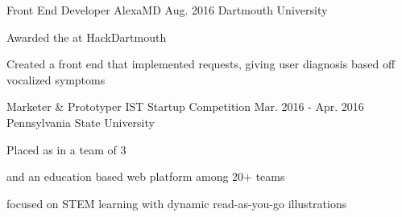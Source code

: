 

\begin{cventries}

%
  \cventry
    {Front End Developer} %
    {AlexaMD} %
    {Aug. 2016} %
    {Dartmouth University} %
    {
      \begin{cvitems} %
        \item {Awarded the  at HackDartmouth}
        \item {Created a  front end that implemented  requests, giving user diagnosis based off vocalized symptoms}
      \end{cvitems}
    }
  \cventry
    {Marketer \& Prototyper} %
    {IST Startup Competition} %
    {Mar. 2016 - Apr. 2016} %
    {Pennsylvania State University} %
    {
      \begin{cvitems} %
        \item { Placed as  in a team of 3}
        \item { and  an education based web platform among 20+ teams}
        \item {focused on STEM learning with dynamic read-as-you-go illustrations}
      \end{cvitems}
    }

\end{cventries}
